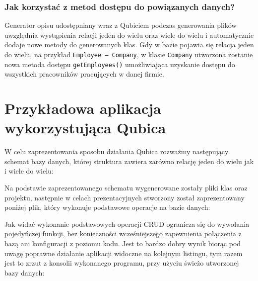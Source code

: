 \documentclass[12pt]{report}
\begin{document}


\subsubsection{Jak korzystać z metod dostępu do powiązanych danych?}

Generator opisu udostępniany wraz z Qubiciem podczas generowania plików \linebreak uwzględnia wystąpienia relacji jeden do wielu oraz wiele do wielu i automatycznie dodaje
nowe metody do generowanych klas.  Gdy w bazie pojawia się relacja jeden do wielu, na przykład {\tt Employee -- Company}, w klasie {\tt Company} utworzona zostanie nowa
metoda dostępu {\tt getEmployees()} umożliwiająca uzyskanie dostępu do wszystkich pracowników pracujących w danej firmie.

\section{Przykładowa aplikacja wykorzystująca Qubica}

W celu zaprezentowania sposobu działania Qubica rozważmy następujący schemat bazy danych, której struktura zawiera zarówno relację jeden do wielu jak i wiele do wielu:



Na podstawie zaprezentowanego schematu wygenerowane zostały pliki klas oraz projektu, następnie w celach prezentacyjnych stworzony został zaprezentowany poniżej
plik, który wykonuje podstawowe operacje na bazie danych:

\newpage



Jak widać wykonanie podstawowych operacji CRUD ogranicza się do wywołania pojedyńczej funkcji, bez konieczności wcześniejszego zapewnienia połączenia z bazą ani
konfiguracji z poziomu kodu. Jest to bardzo dobry wynik biorąc pod uwagę poprawne działanie aplikacji widoczne na kolejnym listingu, tym razem jest to zrzut z konsolii
wykonanego programu, przy użyciu świeżo utworzonej bazy danych:


\end{document}
